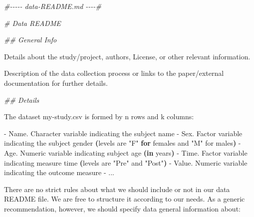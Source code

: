 \documentclass[
  11pt,
]{book}
\newenvironment{Shaded}{\begin{snugshade}}{\end{snugshade}}
\newcommand{\CommentTok}[1]{\textcolor[rgb]{0.56,0.35,0.01}{\textit{#1}}}
\newcommand{\ControlFlowTok}[1]{\textcolor[rgb]{0.13,0.29,0.53}{\textbf{#1}}}
\newcommand{\ErrorTok}[1]{\textcolor[rgb]{0.64,0.00,0.00}{\textbf{#1}}}
\newcommand{\ExtensionTok}[1]{#1}
\newcommand{\KeywordTok}[1]{\textcolor[rgb]{0.13,0.29,0.53}{\textbf{#1}}}
\newcommand{\NormalTok}[1]{#1}
\newcommand{\StringTok}[1]{\textcolor[rgb]{0.31,0.60,0.02}{#1}}
\begin{document}
\begin{Shaded}
\begin{Highlighting}[]
\CommentTok{\#{-}{-}{-}{-}{-}     data{-}README.md    {-}{-}{-}{-}\#}

\CommentTok{\# Data README}

\CommentTok{\#\# General Info }

\ExtensionTok{Details}\NormalTok{ about the study/project, authors, License, or other relevant }
\ExtensionTok{information.}

\ExtensionTok{Description}\NormalTok{ of the data collection process or links to the paper/external }
\ExtensionTok{documentation}\NormalTok{ for further details.}

\CommentTok{\#\# Details}

\ExtensionTok{The}\NormalTok{ dataset }\KeywordTok{\textasciigrave{}}\ExtensionTok{my{-}study.csv}\KeywordTok{\textasciigrave{}}\NormalTok{ is formed by n rows and k columns:}

\ExtensionTok{{-}} \KeywordTok{\textasciigrave{}}\ExtensionTok{Name}\KeywordTok{\textasciigrave{}}\NormalTok{. Character variable indicating the subject name}
\ExtensionTok{{-}} \KeywordTok{\textasciigrave{}}\ExtensionTok{Sex}\KeywordTok{\textasciigrave{}}\NormalTok{. Factor variable indicating the subject gender }\ErrorTok{(}\ExtensionTok{levels}\NormalTok{ are }\KeywordTok{\textasciigrave{}}\StringTok{"F"}\KeywordTok{\textasciigrave{}} 
         \ControlFlowTok{for}\NormalTok{ females }\ExtensionTok{and} \KeywordTok{\textasciigrave{}}\StringTok{"M"}\KeywordTok{\textasciigrave{}}\NormalTok{ for males}\KeywordTok{)}
\ExtensionTok{{-}} \KeywordTok{\textasciigrave{}}\ExtensionTok{Age}\KeywordTok{\textasciigrave{}}\NormalTok{. Numeric variable indicating subject age }\ErrorTok{(in} \ExtensionTok{years}\KeywordTok{)}
\ExtensionTok{{-}} \KeywordTok{\textasciigrave{}}\ExtensionTok{Time}\KeywordTok{\textasciigrave{}}\NormalTok{. Factor variable indicating measure time }\ErrorTok{(}\ExtensionTok{levels}\NormalTok{ are }\KeywordTok{\textasciigrave{}}\StringTok{"Pre"}\KeywordTok{\textasciigrave{}}\NormalTok{ and}
          \KeywordTok{\textasciigrave{}}\StringTok{"Post"}\KeywordTok{\textasciigrave{})}
\ExtensionTok{{-}} \KeywordTok{\textasciigrave{}}\ExtensionTok{Value}\KeywordTok{\textasciigrave{}}\NormalTok{. Numeric variable indicating the outcome measure}
\ExtensionTok{{-}}\NormalTok{ ...}
\end{Highlighting}
\end{Shaded}

There are no strict rules about what we should include or not in our data README file. We are free to structure it according to our needs. As a generic recommendation, however, we should specify data general information about:
\end{document}
